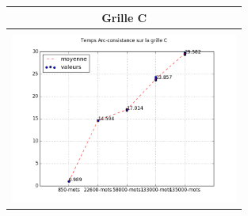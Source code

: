 \documentclass[a4paper,12pt]{report}
\begin{document}
\begin{enumerate}
\begin{table}[!h]
\begin{center}
\begin{tabular}{|c|}
\hline
Grille C\\
\hline
  \\
\includegraphics[width=7.5cm]{AC3_C.png} \\
\hline

\end{tabular}
\end{center}
\end{table}

\end{enumerate}
\end{document}
